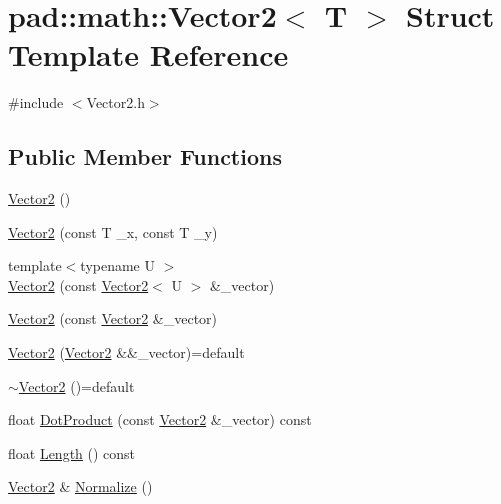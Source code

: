 \hypertarget{structpad_1_1math_1_1_vector2}{}\section{pad\+:\+:math\+:\+:Vector2$<$ T $>$ Struct Template Reference}
\label{structpad_1_1math_1_1_vector2}


{\ttfamily \#include $<$Vector2.\+h$>$}

\subsection*{Public Member Functions}
\begin{DoxyCompactItemize}
\item 
\mbox{\hyperlink{structpad_1_1math_1_1_vector2_afaa3496649b893db8720d87c9dc4f03f}{Vector2}} ()
\item 
\mbox{\hyperlink{structpad_1_1math_1_1_vector2_ab21c64ccea2b5c873a9edf99c452e5a8}{Vector2}} (const T \+\_\+x, const T \+\_\+y)
\item 
{\footnotesize template$<$typename U $>$ }\\\mbox{\hyperlink{structpad_1_1math_1_1_vector2_aec2b96f829aab2b0676be107f35ba20d}{Vector2}} (const \mbox{\hyperlink{structpad_1_1math_1_1_vector2}{Vector2}}$<$ U $>$ \&\+\_\+vector)
\item 
\mbox{\hyperlink{structpad_1_1math_1_1_vector2_a4bc5bd2f108554c6d04972a251823cc0}{Vector2}} (const \mbox{\hyperlink{structpad_1_1math_1_1_vector2}{Vector2}} \&\+\_\+vector)
\item 
\mbox{\hyperlink{structpad_1_1math_1_1_vector2_aa13fef545bfcfad2d085505821d9af37}{Vector2}} (\mbox{\hyperlink{structpad_1_1math_1_1_vector2}{Vector2}} \&\&\+\_\+vector)=default
\item 
\mbox{\hyperlink{structpad_1_1math_1_1_vector2_afb8d7ff79388a1d6fcf2e54a5303bf39}{$\sim$\+Vector2}} ()=default
\item 
float \mbox{\hyperlink{structpad_1_1math_1_1_vector2_a4e06866137ababf33fafbad672c77e75}{Dot\+Product}} (const \mbox{\hyperlink{structpad_1_1math_1_1_vector2}{Vector2}} \&\+\_\+vector) const
\item 
float \mbox{\hyperlink{structpad_1_1math_1_1_vector2_a8e02a8ac515710f437624863b1ce1655}{Length}} () const
\item 
\mbox{\hyperlink{structpad_1_1math_1_1_vector2}{Vector2}} \& \mbox{\hyperlink{structpad_1_1math_1_1_vector2_a58d0df7fcb5f69cebce9e28fc94bf8f5}{Normalize}} ()

\end{DoxyCompactItemize}
